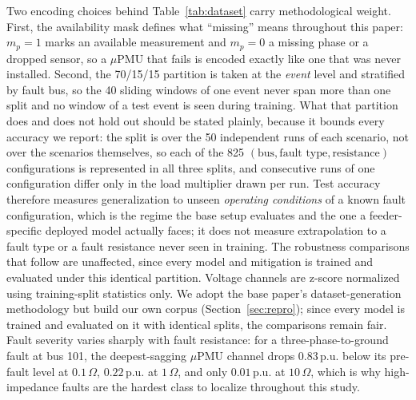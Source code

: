 \documentclass[3p,times,procedia]{elsarticle}
\begin{document}
Two encoding choices behind Table~\ref{tab:dataset} carry methodological weight. First, the availability mask defines what ``missing'' means throughout this paper: $m_p=1$ marks an available measurement and $m_p=0$ a missing phase or a dropped sensor, so a $\mu$PMU that fails is encoded exactly like one that was never installed. Second, the 70/15/15 partition is taken at the \emph{event} level and stratified by fault bus, so the 40 sliding windows of one event never span more than one split and no window of a test event is seen during training. What that partition does and does not hold out should be stated plainly, because it bounds every accuracy we report: the split is over the 50 independent runs of each scenario, not over the scenarios themselves, so each of the 825 $(\text{bus},\text{fault type},\text{resistance})$ configurations is represented in all three splits, and consecutive runs of one configuration differ only in the load multiplier drawn per run. Test accuracy therefore measures generalization to unseen \emph{operating conditions} of a known fault configuration, which is the regime the base setup evaluates and the one a feeder-specific deployed model actually faces; it does not measure extrapolation to a fault type or a fault resistance never seen in training. The robustness comparisons that follow are unaffected, since every model and mitigation is trained and evaluated under this identical partition. Voltage channels are z-score normalized using training-split statistics only. We adopt the base paper's dataset-generation methodology but build our own corpus (Section~\ref{sec:repro}); since every model is trained and evaluated on it with identical splits, the comparisons remain fair. Fault severity varies sharply with fault resistance: for a three-phase-to-ground fault at bus 101, the deepest-sagging $\mu$PMU channel drops $0.83$\,p.u. below its pre-fault level at $0.1\,\Omega$, $0.22$\,p.u. at $1\,\Omega$, and only $0.01$\,p.u. at $10\,\Omega$, which is why high-impedance faults are the hardest class to localize throughout this study.
\end{document}
